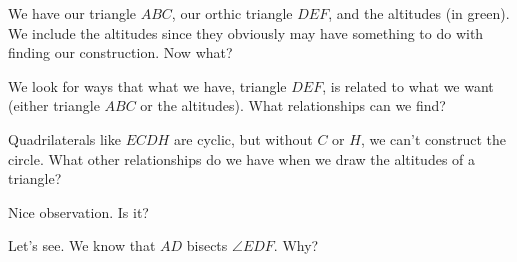 We have our triangle $ABC$, our orthic triangle $DEF$, and the altitudes (in green). We include the altitudes since they obviously may have something to do with finding our construction. Now what?


We look for ways that what we have, triangle $DEF$, is related to what we want (either triangle $ABC$ or the altitudes). What relationships can we find?



Quadrilaterals like $ECDH$ are cyclic, but without $C$ or $H$, we can't construct the circle. What other relationships do we have when we draw the altitudes of a triangle?


Nice observation. Is it?









Let's see. We know that $AD$ bisects $\angle EDF$. Why?

